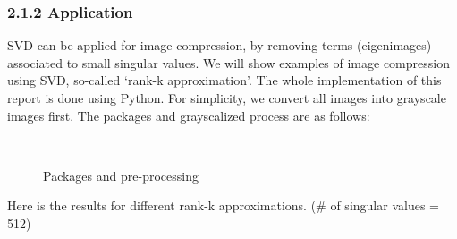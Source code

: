 \documentclass[12pt]{article}
\begin{document}
\subsubsection*{2.1.2 \quad Application}
SVD can be applied for image compression, by removing terms (eigenimages) associated to small singular values.
We will show examples of image compression using SVD, so-called `rank-k approximation'. The whole implementation of 
this report is done using Python. For simplicity, we convert all images into grayscale images first. The packages and 
grayscalized process are as follows:
\begin{figure}[H]
    \centering
    \\
    \caption{Packages and pre-processing}
\end{figure}
\begin{flushleft}
Here is the results for different rank-k approximations. (\# of singular values = 512)  
\end{flushleft}
\end{document}
